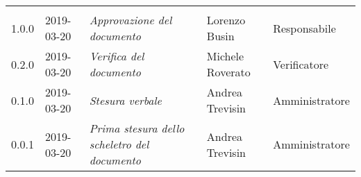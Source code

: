 \newpage 
\section*{}
	\begin{longtable}{C{2cm}|C{2.5cm}|C{4.5cm}|C{2.5cm}|C{3cm}}
	
	 &  &  &  &   \\
	\endhead
		
		1.0.0 & 2019-03-20 & \emph{Approvazione del documento} & Lorenzo Busin & Responsabile \\
		\hline
		
		0.2.0 & 2019-03-20 & \emph{Verifica del documento} & Michele Roverato & Verificatore \\
		\hline

		0.1.0 & 2019-03-20 & \emph{Stesura verbale} & Andrea Trevisin & Amministratore \\
		\hline
		
		0.0.1 & 2019-03-20 & \emph{Prima stesura dello scheletro del documento} & Andrea Trevisin & Amministratore \\
		
\end{longtable}



\clearpage
